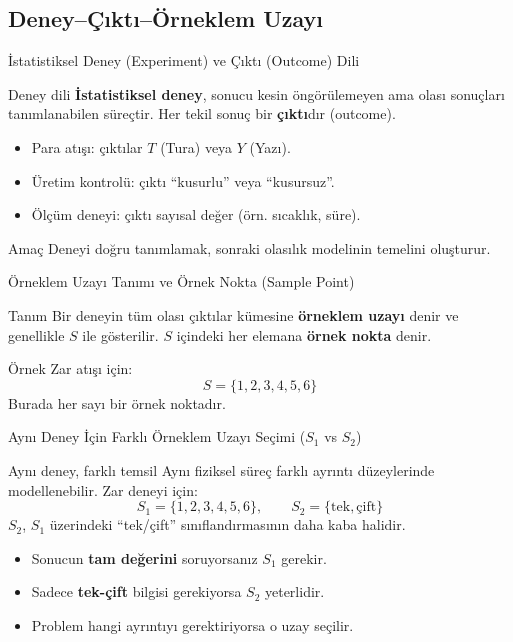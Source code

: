 \documentclass[light]{lutbeamer}
\begin{document}
\subsection{Deney--Çıktı--Örneklem Uzayı}
\begin{frame}{İstatistiksel Deney (Experiment) ve Çıktı (Outcome) Dili}
    \begin{block}{Deney dili}
        \textbf{İstatistiksel deney}, sonucu kesin öngörülemeyen ama olası sonuçları
        tanımlanabilen süreçtir.
        Her tekil sonuç bir \textbf{çıktı}dır (outcome).
    \end{block}

    \begin{itemize}
        \item Para atışı: çıktılar $T$ (Tura) veya $Y$ (Yazı).
        \item Üretim kontrolü: çıktı ``kusurlu'' veya ``kusursuz''.
        \item Ölçüm deneyi: çıktı sayısal değer (örn. sıcaklık, süre).
    \end{itemize}

    \begin{alertblock}{Amaç}
        Deneyi doğru tanımlamak, sonraki olasılık modelinin temelini oluşturur.
    \end{alertblock}
\end{frame}

\begin{frame}{Örneklem Uzayı Tanımı ve Örnek Nokta (Sample Point)}
    \begin{block}{Tanım}
        Bir deneyin tüm olası çıktılar kümesine \textbf{örneklem uzayı} denir ve
        genellikle $S$ ile gösterilir.
        $S$ içindeki her elemana \textbf{örnek nokta} denir.
    \end{block}

    \begin{exampleblock}{Örnek}
        Zar atışı için:
        \[
            S=\{1,2,3,4,5,6\}
        \]
        Burada her sayı bir örnek noktadır.
    \end{exampleblock}
\end{frame}

\begin{frame}[fragile]{Aynı Deney İçin Farklı Örneklem Uzayı Seçimi ($S_1$ vs $S_2$)}
    \begin{block}{Aynı deney, farklı temsil}
        Aynı fiziksel süreç farklı ayrıntı düzeylerinde modellenebilir.
        Zar deneyi için:
        \[
            S_1=\{1,2,3,4,5,6\}, \qquad
            S_2=\{\text{tek},\text{çift}\}
        \]
        $S_2$, $S_1$ üzerindeki ``tek/çift'' sınıflandırmasının daha kaba halidir.
    \end{block}

    \begin{itemize}
        \item Sonucun \textbf{tam değerini} soruyorsanız $S_1$ gerekir.
        \item Sadece \textbf{tek-çift} bilgisi gerekiyorsa $S_2$ yeterlidir.
        \item Problem hangi ayrıntıyı gerektiriyorsa o uzay seçilir.
    \end{itemize}
\end{frame}
\end{document}
